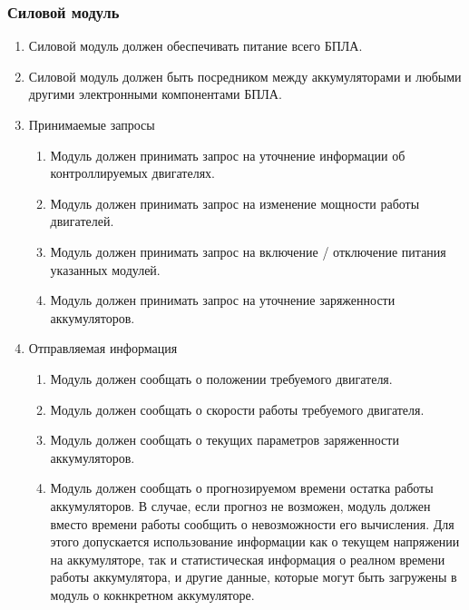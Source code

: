 \documentclass[utf8]{report}
\begin{document}
\subsubsection{Силовой модуль}
\begin{enumerate}
  \item Силовой модуль должен обеспечивать питание всего БПЛА.
  \item Силовой модуль должен быть посредником между аккумуляторами и любыми другими электронными компонентами БПЛА.
  \item Принимаемые запросы
  \begin{enumerate}
    \item Модуль должен принимать запрос на уточнение информации об контроллируемых двигателях.
    \item Модуль должен принимать запрос на изменение мощности работы двигателей.
    \item Модуль должен принимать запрос на включение / отключение питания указанных модулей.
    \item Модуль должен принимать запрос на уточнение заряженности аккумуляторов.
  \end{enumerate}
  \item Отправляемая информация
  \begin{enumerate}
    \item Модуль должен сообщать о положении требуемого двигателя.
    \item Модуль должен сообщать о скорости работы требуемого двигателя.
    \item Модуль должен сообщать о текущих параметров заряженности аккумуляторов.
    \item Модуль должен сообщать о прогнозируемом времени остатка работы аккумуляторов. В случае, если прогноз не возможен, модуль должен вместо времени работы сообщить о невозможности его вычисления. Для этого допускается использование информации как о текущем напряжении на аккумуляторе, так и статистическая информация о реалном времени работы аккумулятора, и другие данные, которые могут быть загружены в модуль о кокнкретном аккумуляторе.
  \end{enumerate}
\end{enumerate}
\end{document}
